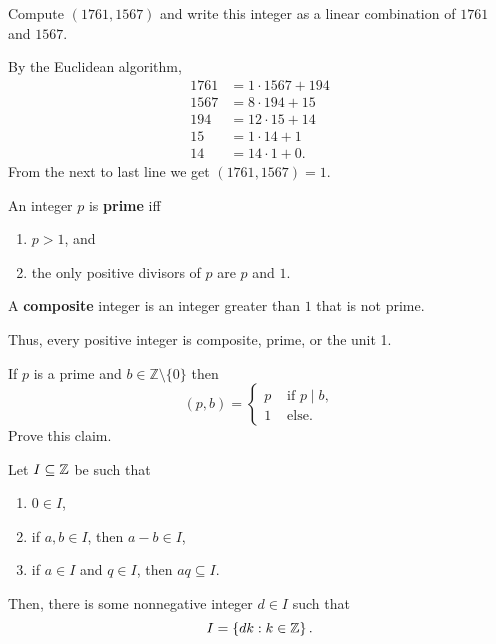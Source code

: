 \documentclass[11pt,a4paper]{article}
\begin{document}
\begin{exa}
    Compute \((1761, 1567)\) and write this integer as a linear combination of \(1761\) and \(1567\).
\end{exa}

\begin{sol} By the Euclidean algorithm,
   \begin{align*}
    1761 &= 1\cdot 1567 + 194\\
    1567 &= 8\cdot194 + 15\\
    194  &= 12\cdot 15 + 14\\
    15   &= 1\cdot 14 + 1 \\
    14   &= 14\cdot 1 + 0.
   \end{align*}
   From the next to last line we get \((1761,1567) = 1\).
\end{sol}

\begin{defi}
    An integer \(p\) is \textbf{prime} iff 
    \begin{enumerate}[label=(\roman*)]
        \item \(p>1\), and
        \item the only positive divisors of \(p\) are \(p\) and \(1\).
    \end{enumerate}
    A \textbf{composite} integer is an integer greater than \(1\) that is not prime.
\end{defi}

Thus, every positive integer is composite, prime, or the unit 1.

\begin{rem}\label{rmk:gcd.of.prime.and.integer}
    If $p$ is a prime and $b \in \mathbb{Z}\setminus \{0\}$ then
\[
(p, b)= \begin{cases}p & \text { if } p \mid b, \\ 1 & \text { else.}\end{cases}
\]
Prove this claim.
\end{rem}

\begin{prop}
    Let \(I\subseteq \mathbb{Z}\) be such that 
    \begin{enumerate}[label=(\roman*)]
        \item\label{lab:i.exercise.ideal.of.Z} \(0\in I\),
        \item\label{lab:ii.exercise.ideal.of.Z} if  \(a,b\in I\), then \(a-b\in I\), 
        \item\label{lab:iii.exercise.ideal.of.Z} if \(a\in I\) and \(q\in I\), then  \(aq\subseteq I\).
    \end{enumerate}
    Then, there is some nonnegative integer \(d\in I\) such that  \[I = \left\{ dk: k \in \mathbb{Z} \right\}.\]
\end{prop}
\end{document}
